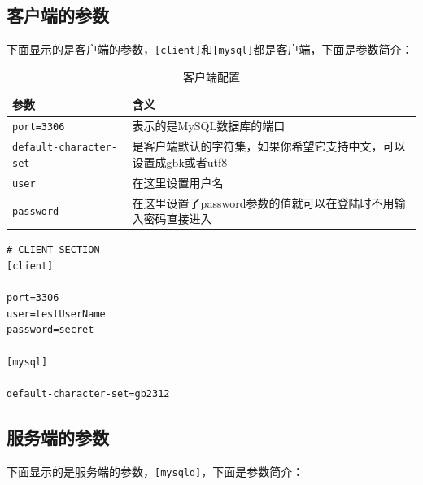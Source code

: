 \documentclass[UTF8,a4paper,12pt]{ctexbook}
\begin{document}
		\subsection{客户端的参数}
			下面显示的是客户端的参数，\verb|[client]|和\verb|[mysql]|都是客户端，下面是参数简介：
			
			\begin{table}[H]
				\centering
				\caption{客户端配置}
				\begin{tabular}{p{5cm}<{\centering}|p{12cm}<{\centering}}
					\toprule
						参数 &  含义 \\
					\midrule
						\verb|port=3306  | & 表示的是MySQL数据库的端口 \\
						\verb|default-character-set | & 是客户端默认的字符集，如果你希望它支持中文，可以设置成gbk或者utf8 \\
						\verb|user| & 在这里设置用户名\\
						\verb|password | & 在这里设置了password参数的值就可以在登陆时不用输入密码直接进入 \\
					\bottomrule
				\end{tabular}
			\end{table}	
			
			\begin{lstlisting}
# CLIENT SECTION
[client]

port=3306
user=testUserName
password=secret

[mysql]

default-character-set=gb2312			
			\end{lstlisting}
		
		\newpage
		\subsection{服务端的参数}	
			下面显示的是服务端的参数，\verb|[mysqld]|，下面是参数简介：
			
\end{document}
